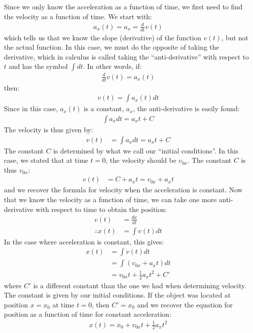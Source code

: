 Since we only know the acceleration as a function of time, we first need to find the velocity as a function of time. We start with:
\begin{align*}
a_x(t)=a_x=\frac{d}{dt} v(t)
\end{align*}
which tells us that we know the slope (derivative) of the function $v(t)$, but not the actual function. In this case, we must do the opposite of taking the derivative, which in calculus is called taking the ``anti-derivative'' with respect to $t$ and has the symbol $\int dt$. In other words, if:
\begin{align*}
\frac{d}{dt} v(t) =a_x(t)
\end{align*}
then:
\begin{align*}
v(t) =\int a_x(t) dt
\end{align*}
Since in this case, $a_x(t)$ is a constant, $a_x$, the anti-derivative is easily found:
\begin{align*}
\int a_xdt = a_xt + C
\end{align*}
The velocity is thus given by:
\begin{align*}
v(t) &=\int a_x dt =a_xt+C
\end{align*}
The constant $C$ is determined by what we call our ``initial conditions''. In this case, we stated that at time $t=0$, the velocity should be $v_{0x}$. The constant $C$ is thus $v_{0x}$:
\begin{align*}
v(t) &=C+a_x t =v_{0x}+a_xt
\end{align*}
and we recover the formula for velocity when the acceleration is constant. Now that we know the velocity as a function of time, we can take one more anti-derivative with respect to time to obtain the position:
\begin{align*}
v(t) &= \frac{dx}{dt}\\
\therefore x(t) &= \int v(t)dt 
\end{align*}
In the case where acceleration is constant, this gives:
\begin{align*}
 x(t) &= \int v(t)dt\\
 &=\int (v_{0x}+a_xt )dt\\
 &=v_{0x}t+\frac{1}{2}a_xt^2+C'
\end{align*} 
where $C'$ is a different constant than the one we had when determining velocity. The constant is given by our initial conditions. If the object was located at position $x=x_0$ at time $t=0$, then $C'=x_0$ and we recover the equation for position as a function of time for constant acceleration:
\begin{align*}
x(t)=x_0+v_{0x}t+\frac{1}{2}a_xt^2
\end{align*}

